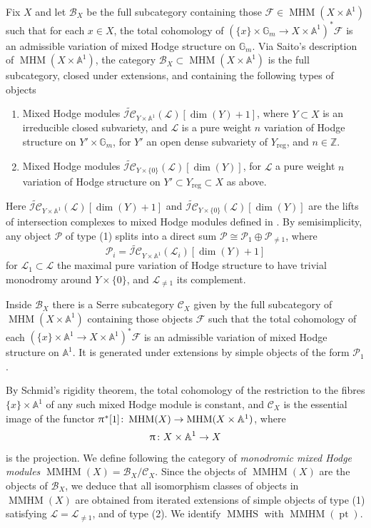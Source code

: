 \documentclass[a4paper,10pt]{amsart}
\renewcommand{\pi}{\uppi\hspace{0.05em}}
\renewcommand{\AA}{\mathbb{A}}
\newcommand{\GG}{\mathbb{G}}
\newcommand{\ICSn}{\tilde{\mathcal{IC}}}
\DeclareMathOperator{\reg}{reg}
\DeclareMathOperator{\MMHM}{MMHM}
\DeclareMathOperator{\MMHS}{MMHS}
\DeclareMathOperator{\MHM}{MHM}
\DeclareMathOperator{\pt}{pt}
\begin{document}
\smallbreak
Fix $X$ and let $\mathcal{B}_X$ be the full subcategory containing those $\mathcal{F}\in\MHM(X\times\mathbb{A}^1)$ such that for each $x\in X$, the total cohomology of $(\{x\}\times\GG_m\rightarrow X\times\AA^1)^*\mathcal{F}$ is an admissible variation of mixed Hodge structure on $\GG_m$.  Via Saito's description of $\MHM(X\times\mathbb{A}^1)$, the category $\mathcal{B}_X\subset \MHM(X\times\mathbb{A}^1)$ is the full subcategory, closed under extensions, and containing the following types of objects
\begin{enumerate}
\item
Mixed Hodge modules $\ICSn_{Y\times \mathbb{A}^1}(\mathcal{L})[\dim(Y)+1]$, where $Y\subset X$ is an irreducible closed subvariety, and $\mathcal{L}$ is a pure weight $n$ variation of Hodge structure on $Y'\times\mathbb{G}_m$, for $Y'$ an open dense subvariety of $Y_{\reg}$, and $n\in\mathbb{Z}$.
\item
Mixed Hodge modules $\ICSn_{Y\times \{0\}}(\mathcal{L})[\dim(Y)]$, for $\mathcal{L}$ a pure weight $n$ variation of Hodge structure on $Y'\subset Y_{\reg}\subset X$ as above.
\end{enumerate}
Here $\ICSn_{Y\times \mathbb{A}^1}(\mathcal{L})[\dim(Y)+1]$ and $\ICSn_{Y\times \{0\}}(\mathcal{L})[\dim(Y)]$ are the lifts of intersection complexes to mixed Hodge modules defined in \cite[Thm.3.21]{Saito90}.  By semisimplicity, any object $\mathcal{P}$ of type (1) splits into a direct sum $\mathcal{P}\cong \mathcal{P}_1\oplus\mathcal{P}_{\neq 1}$, where
\[
\mathcal{P}_i=\ICSn_{Y\times \mathbb{A}^1}(\mathcal{L}_i)[\dim(Y)+1]
\]
for $\mathcal{L}_1\subset\mathcal{L}$ the maximal pure variation of Hodge structure to have trivial monodromy around $Y\times\{0\}$, and $\mathcal{L}_{\neq 1}$ its complement.



Inside $\mathcal{B}_X$ there is a Serre subcategory $\mathcal{C}_X$ given by the full subcategory of $\MHM(X\times\AA^1)$ containing those objects $\mathcal{F}$ such that the total cohomology of each $(\{x\}\times\AA^1\rightarrow X\times \AA^1)^*\mathcal{F}$ is an admissible variation of mixed Hodge structure on $\mathbb{A}^1$.    It is generated under extensions by simple objects of the form $\mathcal{P}_1$.  

By Schmid's rigidity theorem, the total cohomology of the restriction to the fibres $\{x\}\times\mathbb{A}^1$ of any such mixed Hodge module is constant, and $\mathcal{C}_X$ is the essential image of the functor $\pi^*[1]\colon \MHM(X)\rightarrow\MHM(X\times\mathbb{A}^1)$, where 
\[
\pi\colon X\times\mathbb{A}^1\rightarrow X
\]
is the projection.  We define following \cite[Sec.7]{KS2} the category of \textit{monodromic mixed Hodge modules} $\MMHM(X)=\mathcal{B}_X/\mathcal{C}_X$.  Since the objects of $\MMHM(X)$ are the objects of $\mathcal{B}_X$, we deduce that all isomorphism classes of objects in $\MMHM(X)$ are obtained from iterated extensions of simple objects of type (1) satisfying $\mathcal{L}=\mathcal{L}_{\neq 1}$, and of type (2).  We identify $\MMHS$ with $\MMHM(\pt)$.
\smallbreak
\end{document}
